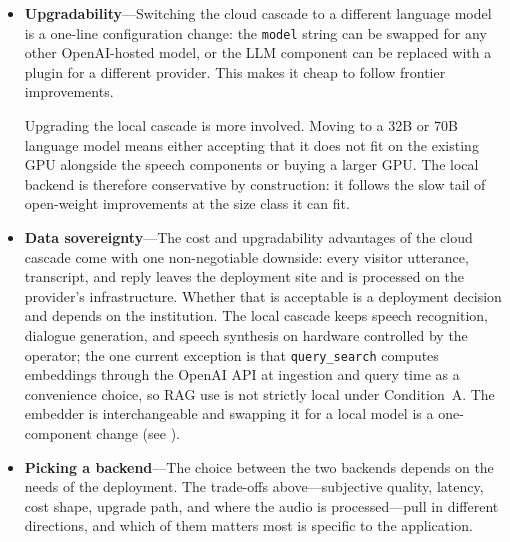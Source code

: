 \begin{itemize}
    The local cascade has no per-token API fee, but it is not free: it requires up-front hardware, plus ongoing electricity, maintenance, administrator time, GPU opportunity cost, and the effort of pulling in model updates. The remainder of this paragraph focuses on the hardware up-front cost, which dominates at the usage scale of a faculty reception; the other items are smaller and harder to attribute and are left out of the comparison. The GPU used here (see ) lists for about USD~1{,}250~\cite{nvidia_rtx4000_sff}. Dividing the GPU price by the cloud per-hour rate gives a break-even of roughly 4{,}170 hours of active conversation. Depending on how much the robot is actively used---between two and six hours of conversation per day is a reasonable range for a faculty reception---the GPU pays for itself in roughly two to six years.

    \item \textbf{Upgradability}---Switching the cloud cascade to a different language model is a one-line configuration change: the \texttt{model} string can be swapped for any other OpenAI-hosted model, or the LLM component can be replaced with a plugin for a different provider. This makes it cheap to follow frontier improvements.

    Upgrading the local cascade is more involved. Moving to a 32B or 70B language model means either accepting that it does not fit on the existing GPU alongside the speech components or buying a larger GPU. The local backend is therefore conservative by construction: it follows the slow tail of open-weight improvements at the size class it can fit.

    \item \textbf{Data sovereignty}---The cost and upgradability advantages of the cloud cascade come with one non-negotiable downside: every visitor utterance, transcript, and reply leaves the deployment site and is processed on the provider's infrastructure. Whether that is acceptable is a deployment decision and depends on the institution. The local cascade keeps speech recognition, dialogue generation, and speech synthesis on hardware controlled by the operator; the one current exception is that \texttt{query\_search} computes embeddings through the OpenAI API at ingestion and query time as a convenience choice, so RAG use is not strictly local under Condition~A. The embedder is interchangeable and swapping it for a local model is a one-component change (see ).

    \item \textbf{Picking a backend}---The choice between the two backends depends on the needs of the deployment. The trade-offs above---subjective quality, latency, cost shape, upgrade path, and where the audio is processed---pull in different directions, and which of them matters most is specific to the application.
\end{itemize}


